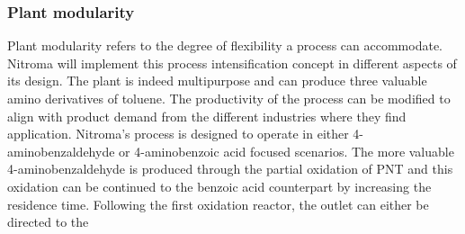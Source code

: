 \subsubsection{Plant modularity} %
Plant modularity refers to the degree of flexibility a process can accommodate. Nitroma will implement this process intensification concept in different aspects of its design. The plant is indeed multipurpose and can produce three valuable amino derivatives of toluene. The productivity of the process can be modified to align with product demand from the different industries where they find application. Nitroma's process is designed to operate in either 4-aminobenzaldehyde or 4-aminobenzoic acid focused scenarios. The more valuable 4-aminobenzaldehyde is produced through the partial oxidation of PNT and this oxidation can be continued to the benzoic acid counterpart by increasing the residence time. Following the first oxidation reactor, the outlet can either be directed to the 







